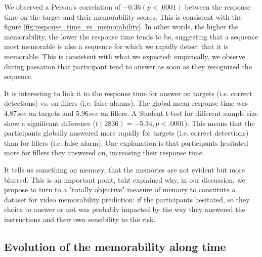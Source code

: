 \documentclass[sigconf]{acmart}
\begin{document}
We observed a Person's correlation of $-0.36 (p<.0001)$ between the response time on the target and their memorability scores. This is consistent with the figure \ref{fig:response_time_vs_memorability}. In other words, the higher the memorability, the lower the response time tends to be, suggesting that a sequence most memorable is also a sequence for which we rapidly detect that it is memorable. This is consistent with what we expected: empirically, we observe during passation that participant tend to answer as soon as they recognized the sequence.

It is interesting to link it to the response time for answer on targets (i.e. correct detections) vs. on fillers (i.e. false alarms). The global mean response time was $4.87 sec$ on targets and $5.96 sec$ on fillers. A Student t-test for different sample size show a significant difference ($t(2836)=-5.34, p<.0001$). This means that the participants globally answered more rapidly for targets (i.e. correct detections) than for fillers (i.e. false alarm). One explanation is that participants hesitated more for fillers they answered on, increasing their response time.

It tells us something on memory, that the memories are not evident but more blurred. This is an important point, taht explained why, in our discussion, we propose to turn to a "totally objective" measure of memory to constitute a dataset for video memorability prediction: if the participants hesitated, so they choice to answer or not was probably impacted by the way they answered the instructions and their own sensibility to the risk.%



\subsection{Evolution of the memorability along time}






\end{document}
